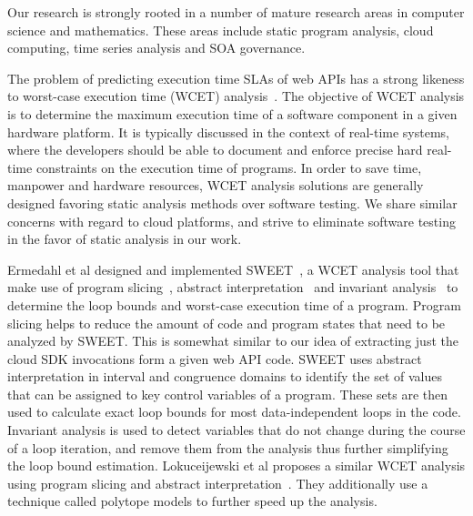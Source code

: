 Our research is strongly rooted in a number of mature research areas in computer 
science and mathematics. These areas include static program analysis, cloud computing, time series analysis
and SOA governance.

The problem of predicting execution time SLAs of web APIs has a strong likeness to worst-case execution
time (WCET) analysis~\cite{Wilhelm:2008:WEP:1347375.1347389}. The objective of WCET analysis is to determine the maximum execution time of a software component in a given hardware platform. It is 
typically discussed in the context of real-time systems, where the developers should be able to document
and enforce precise hard real-time constraints on the execution time of programs. In order to save time, 
manpower and hardware resources, WCET analysis solutions are generally designed favoring static
analysis methods over software testing. We share similar concerns with regard to cloud platforms,
and strive to eliminate software testing in the favor of static analysis in our work. 

Ermedahl et al designed and implemented SWEET~\cite{ermedahl2007loop}, a WCET analysis tool that make use of program slicing~\cite{Sandberg:2006:FWF:1134650.1134666},
 abstract interpretation~\cite{Cousot:1977:AIU:512950.512973} and invariant analysis~\cite{Muchnick:1998:ACD:286076} to determine the loop bounds and worst-case execution time 
 of a program. Program slicing helps to reduce the amount of code and program states that need to be 
 analyzed by SWEET. This is somewhat similar to our idea of extracting just the cloud SDK invocations form 
 a given web API code. SWEET uses abstract interpretation in interval and congruence domains to identify
 the set of values that can be assigned to key control variables of a program. These sets are then
 used to calculate exact loop bounds for most data-independent loops in the code. Invariant analysis  is
 used to detect variables that do not change during the course of a loop iteration, and remove them from
 the analysis thus further simplifying the loop bound estimation. Lokuceijewski et al proposes 
 a similar WCET analysis using program slicing and abstract interpretation~\cite{Lokuciejewski:2009:FPS:1545006.1545064}. They additionally use a technique
called polytope models to further speed up the analysis.
 
